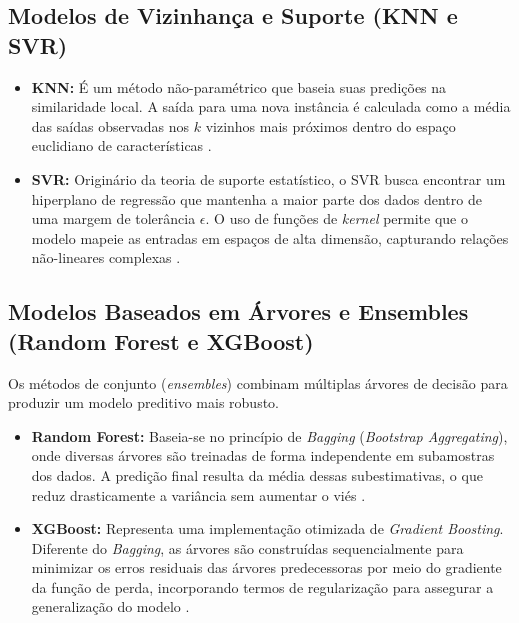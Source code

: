 \subsection{Modelos de Vizinhança e Suporte (KNN e SVR)}

\begin{itemize}
    \item \textbf{\gls{KNN}:} É um método não-paramétrico que baseia suas predições na similaridade local. A saída para uma nova instância é calculada como a média das saídas observadas nos $k$ vizinhos mais próximos dentro do espaço euclidiano de características \cite{monard2003conceitos, James_2013_ISLR}.
    \item \textbf{\gls{SVR}:} Originário da teoria de suporte estatístico, o \gls{SVR} busca encontrar um hiperplano de regressão que mantenha a maior parte dos dados dentro de uma margem de tolerância $\epsilon$. O uso de funções de \textit{kernel} permite que o modelo mapeie as entradas em espaços de alta dimensão, capturando relações não-lineares complexas \cite{Hastie_2009_ESL, monard2003conceitos}.
\end{itemize}

\subsection{Modelos Baseados em Árvores e Ensembles (Random Forest e XGBoost)}

Os métodos de conjunto (\textit{ensembles}) combinam múltiplas árvores de decisão para produzir um modelo preditivo mais robusto.

\begin{itemize}
    \item \textbf{Random Forest:} Baseia-se no princípio de \textit{Bagging} (\textit{Bootstrap Aggregating}), onde diversas árvores são treinadas de forma independente em subamostras dos dados. A predição final resulta da média dessas subestimativas, o que reduz drasticamente a variância sem aumentar o viés \cite{Breiman_2001_RandomForests, James_2013_ISLR}.
    \item \textbf{XGBoost:} Representa uma implementação otimizada de \textit{Gradient Boosting}. Diferente do \textit{Bagging}, as árvores são construídas sequencialmente para minimizar os erros residuais das árvores predecessoras por meio do gradiente da função de perda, incorporando termos de regularização para assegurar a generalização do modelo \cite{Chen_2016_XGBoost}.
\end{itemize}

